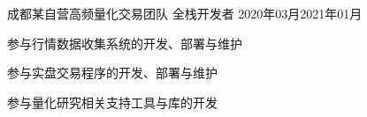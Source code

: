 
\begin{projitem}
    {成都某自营高频量化交易团队}
    {全栈开发者}
    {2020年03月}{2021年01月}
    \item 参与行情数据收集系统的开发、部署与维护
    \item 参与实盘交易程序的开发、部署与维护
    \item 参与量化研究相关支持工具与库的开发
\end{projitem}

\endinput